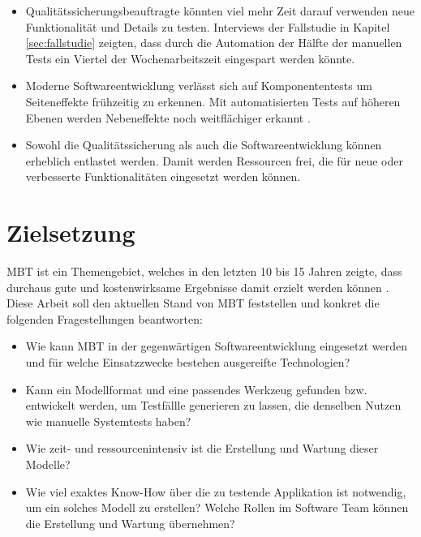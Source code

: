 \begin{itemize}
	\item Qualitätssicherungsbeauftragte könnten viel mehr Zeit darauf verwenden neue Funktionalität und Details zu testen. Interviews der Fallstudie in Kapitel \ref{sec:fallstudie} zeigten, dass durch die Automation der Hälfte der manuellen Tests ein Viertel der Wochenarbeitszeit eingespart werden könnte. 
	\item Moderne Softwareentwicklung verlässt sich auf Komponententests um Seiteneffekte  frühzeitig zu erkennen. Mit automatisierten Tests auf höheren Ebenen werden Nebeneffekte noch weitflächiger erkannt \cite{pol_management_2002}.
	\item Sowohl die Qualitätssicherung als auch die Softwareentwicklung können erheblich entlastet werden. Damit werden Ressourcen frei, die für neue oder verbesserte Funktionalitäten eingesetzt werden können.
\end{itemize}

\section{Zielsetzung}

\Gls{MBT} ist ein Themengebiet, welches in den letzten 10 bis 15 Jahren zeigte, dass durchaus gute und kostenwirksame Ergebnisse damit erzielt werden können \cite{utting_practical_2007}. Diese Arbeit soll den aktuellen Stand von \Gls{MBT} feststellen und konkret die folgenden Fragestellungen beantworten:

\begin{itemize}
	\item Wie kann \Gls{MBT} in der gegenwärtigen Softwareentwicklung eingesetzt werden und für welche Einsatzzwecke bestehen ausgereifte Technologien?
	\item Kann ein Modellformat und eine passendes Werkzeug gefunden bzw. entwickelt werden, um Testfällle generieren zu lassen, die denselben Nutzen wie manuelle Systemtests haben?
	\item Wie zeit- und ressourcenintensiv ist die Erstellung und Wartung dieser Modelle?
	\item Wie viel exaktes Know-How über die zu testende Applikation ist notwendig, um ein solches Modell zu erstellen? Welche Rollen im Software Team können die Erstellung und Wartung übernehmen?
\end{itemize}

